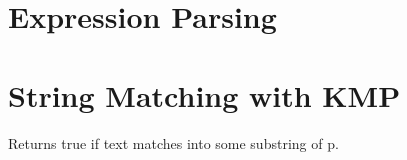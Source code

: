 	\section{Expression Parsing}
	
	

	\section{String Matching with KMP}

	Returns true if text matches into some substring of p.

	

